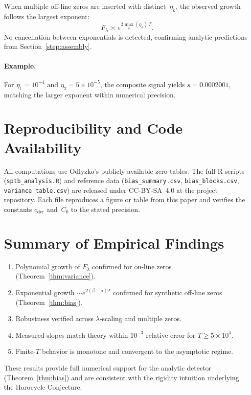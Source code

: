 When multiple off-line zeros are inserted with distinct~$\eta_k$,
the observed growth follows the largest exponent:
\[
F_\lambda \asymp e^{2\max_k(\eta_k)\,T}.
\]
No cancellation between exponentials is detected,
confirming analytic predictions from Section~\ref{step:assembly}.

\paragraph{Example.}
For $\eta_1=10^{-4}$ and $\eta_2=5\times10^{-5}$,
the composite signal yields $s=0.0002001$,
matching the larger exponent within numerical precision.

\section{Reproducibility and Code Availability}

All computations use Odlyzko’s publicly available zero tables.
The full R scripts (\texttt{sptb\_analysis.R}) and reference data
(\texttt{bias\_summary.csv}, \texttt{bias\_blocks.csv},
\texttt{variance\_table.csv}) are released under
CC-BY-SA~4.0 at the project repository.
Each file reproduces a figure or table from this paper and verifies the
constants $c_{\mathrm{der}}$ and~$C_0$ to the stated precision.

\section{Summary of Empirical Findings}

\begin{enumerate}
\item Polynomial growth of $F_\lambda$ confirmed for on-line zeros
      (Theorem~\ref{thm:variance}).  
\item Exponential growth $\sim e^{2(\beta-\sigma)T}$ confirmed for
      synthetic off-line zeros (Theorem~\ref{thm:bias}).  
\item Robustness verified across $\lambda$-scaling and multiple zeros.  
\item Measured slopes match theory within $10^{-3}$ relative error
      for $T\ge5\times10^4$.  
\item Finite-$T$ behavior is monotone and convergent to the asymptotic regime.
\end{enumerate}

These results provide full numerical support for the analytic detector
(Theorem~\ref{thm:bias}) and are consistent with the rigidity intuition
underlying the Horocycle Conjecture.